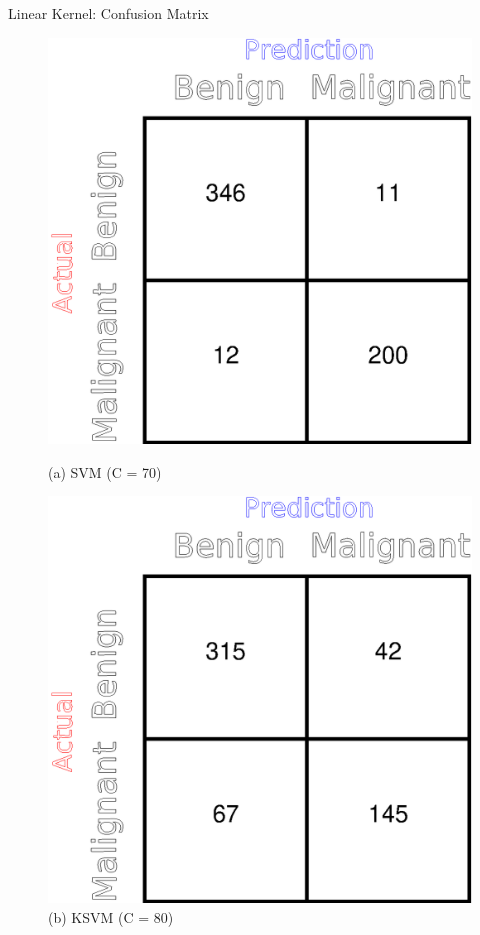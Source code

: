 \documentclass[xcolor=dvipsnames]{beamer}
\begin{document}
\begin{frame}{Linear Kernel: Confusion Matrix}
\begin{figure}[H]
\begin{minipage}[t]{0.5\linewidth}
    \includegraphics[trim={9cm 0cm 0cm 0cm},clip,scale=0.43]{Figures/SVM_Linear_CM.eps}
    \caption*{(a) SVM (C = 70)}
\end{minipage}%
\begin{minipage}[t]{0.5\linewidth}
    \includegraphics[trim={9cm 0cm 0cm 0cm},clip,scale=0.43]{Figures/KSVM_Linear_CM.eps}
    \caption*{(b) KSVM (C = 80)}
\end{minipage} 
\end{figure}
\end{frame}
\end{document}
